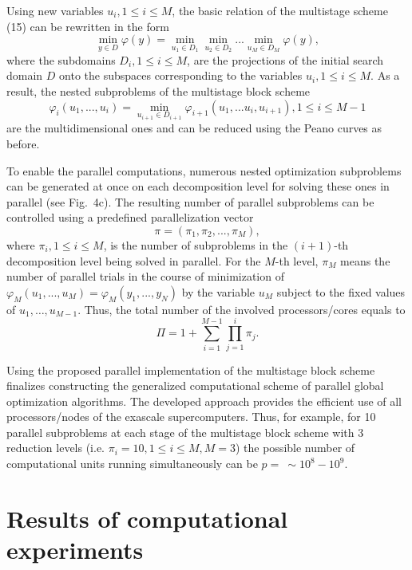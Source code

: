 \documentclass[
11pt,%
tightenlines,%
twoside,%
onecolumn,%
nofloats,%
nobibnotes,%
nofootinbib,%
superscriptaddress,%
noshowpacs,%
centertags]%
{revtex4}
\begin{document}
Using new variables $u_i, 1 \leq i \leq M$, the basic relation of the multistage scheme (15) can be rewritten in the form
\begin{equation}
\min_{y \in D} \varphi(y) = \min_{u_1 \in D_1} \min_{u_2 \in D_2} ... \min_{u_M \in D_M} \varphi(y),
\end{equation}
where the subdomains $D_i, 1 \leq i \leq M$, are the projections of the initial search domain $D$ onto the subspaces corresponding to the variables $u_i,1 \leq i \leq M$. As a result, the nested subproblems of the multistage block scheme
\begin{equation}
\varphi_i(u_1,...,u_i) = \min_{u_{i+1} \in D_{i+1}} \varphi_{i+1}(u_1,...u_i,u_{i+1}), 1 \leq i \leq M - 1
\end{equation}
are the multidimensional ones and can be reduced using the Peano curves as before.

To enable the parallel computations, numerous nested optimization subproblems can be generated at once on each decomposition level for solving these ones in parallel \cite{Sergeyev7} (see Fig.~4c). The resulting number of parallel subproblems can be controlled using a predefined parallelization vector
\begin{equation}
\pi = (\pi_1, \pi_2, ..., \pi_M),
\end{equation}
where $\pi_i, 1 \leq i \leq M$, is the number of subproblems in the $(i+1)$-th decomposition level being solved in parallel. For the $M$-th level, $\pi_M$ means the number of parallel trials in the course of minimization of $\varphi_M(u_1,...,u_M) = \varphi_M(y_1,...,y_N)$ by the variable $u_M$  subject to the fixed values of $u_1, \dots, u_{M-1}$. Thus, the total number of the involved processors/cores equals to
\begin{equation}
\Pi = 1 + \sum_{i=1}^{M-1} \prod_{j=1}^i \pi_j.
\end{equation}

Using the proposed parallel implementation of the multistage block scheme finalizes constructing the generalized computational scheme of parallel global optimization algorithms. The developed approach provides the efficient use of all processors/nodes of the exascale supercomputers. Thus, for example, for 10 parallel subproblems at each stage of the multistage block scheme with 3 reduction levels (i.e. $\pi_i = 10, 1 \leq i \leq M, M = 3$) the possible number of computational units running simultaneously can be $p = \ \sim10^8-10^9$. 

\section{Results of computational experiments}
\end{document}
